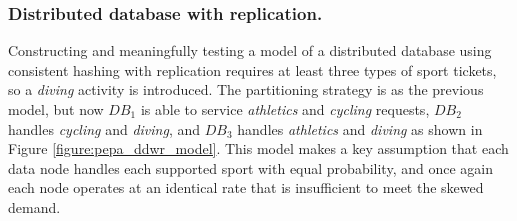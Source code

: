 %
%
\FloatBarrier
\subsubsection{Distributed database with replication.}  Constructing and meaningfully testing a model of a distributed database using consistent hashing with replication requires at least three types of sport tickets, so a {\itshape diving} activity is introduced.  The partitioning strategy is as the previous model, but now $\mathit{DB_1}$ is able to service {\itshape athletics} and {\itshape cycling} requests,  $\mathit{DB_2}$ handles {\itshape cycling} and {\itshape diving}, and $\mathit{DB_3}$ handles {\itshape athletics} and {\itshape diving} as shown in Figure \ref{figure:pepa_ddwr_model}.  This model makes a key assumption that each data node handles each supported sport with equal probability, and once again each node operates at an identical rate that is insufficient to meet the skewed demand.

